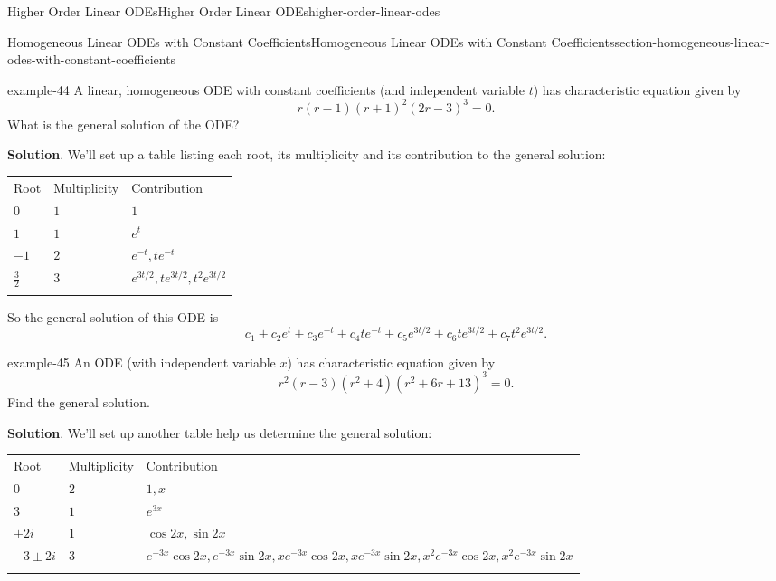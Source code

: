 \documentclass[oneside,10pt,]{book}
\numberwithin{equation}{section}
\newcommand{\hrulethick} {\noalign{\hrule height 0.11em}}
\begin{document}
\begin{chapterptx}{Higher Order Linear ODEs}{}{Higher Order Linear ODEs}{}{}{higher-order-linear-odes}
\begin{sectionptx}{Homogeneous Linear ODEs with Constant Coefficients}{}{Homogeneous Linear ODEs with Constant Coefficients}{}{}{section-homogeneous-linear-odes-with-constant-coefficients}
\begin{example}{}{example-44}%
\hypertarget{p-277}{}%
A linear, homogeneous ODE with constant coefficients (and independent variable \(t\)) has characteristic equation given by%
\begin{equation*}
r(r-1)(r+1)^{2}(2r-3)^{3} = 0.
\end{equation*}
What is the general solution of the ODE?%
\par\smallskip%
\noindent\textbf{Solution}.\hypertarget{solution-41}{}\quad%
\hypertarget{p-278}{}%
We'll set up a table listing each root, its multiplicity and its contribution to the general solution:%
\begin{table}
\centering
\begin{tabular}{lll}\hrulethick
Root&Multiplicity&Contribution\tabularnewline\hrulethick
\(0\)&\(1\)&\(1\)\tabularnewline\hrulethick
\(1\)&\(1\)&\(e^{t}\)\tabularnewline\hrulethick
\(-1\)&\(2\)&\(e^{-t},te^{-t}\)\tabularnewline\hrulethick
\(\frac{3}{2}\)&\(3\)&\(e^{3t/2},te^{3t/2},t^{2}e^{3t/2}\)\tabularnewline\hrulethick
\end{tabular}
\end{table}
 So the general solution of this ODE is%
\begin{equation*}
c_{1}+c_{2}e^{t}+c_{3}e^{-t}+c_{4}te^{-t}+c_{5}e^{3t/2}+c_{6}te^{3t/2}+c_{7}t^{2}e^{3t/2}.
\end{equation*}
\end{example}
\begin{example}{}{example-45}%
\hypertarget{p-279}{}%
An ODE (with independent variable \(x\)) has characteristic equation given by%
\begin{equation*}
r^{2}(r-3)(r^{2}+4)(r^{2}+6r+13)^{3}=0.
\end{equation*}
Find the general solution.%
\par\smallskip%
\noindent\textbf{Solution}.\hypertarget{solution-42}{}\quad%
\hypertarget{p-280}{}%
We'll set up another table help us determine the general solution:%
\begin{table}
\centering
\begin{tabular}{lll}\hrulethick
Root&Multiplicity&Contribution\tabularnewline\hrulethick
\(0\)&\(2\)&\(1,x\)\tabularnewline\hrulethick
\(3\)&\(1\)&\(e^{3x}\)\tabularnewline\hrulethick
\(\pm2i\)&\(1\)&\(\cos2x,\sin2x\)\tabularnewline\hrulethick
\(-3\pm2i\)&\(3\)&\(e^{-3x}\cos2x,e^{-3x}\sin2x,xe^{-3x}\cos2x,xe^{-3x}\sin2x,x^{2}e^{-3x}\cos2x,x^{2}e^{-3x}\sin2x\)\tabularnewline\hrulethick
\end{tabular}
\end{table}

\end{example}
\end{sectionptx}
\end{chapterptx}
\end{document}
